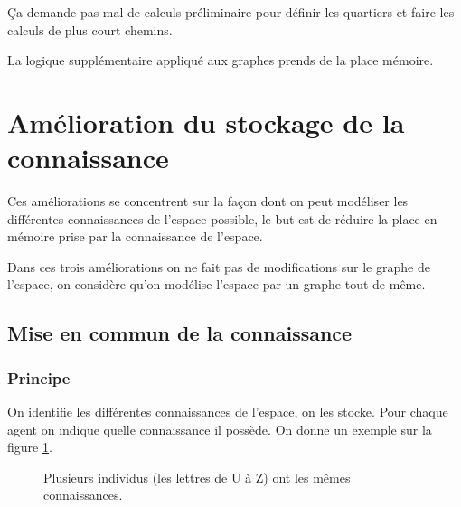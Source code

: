 \documentclass[a4paper]{article}
\begin{document}
Ça demande pas mal de calculs préliminaire pour définir les quartiers et
faire les calculs de plus court chemins.

La logique supplémentaire appliqué aux graphes prends de la place mémoire.

\section{Amélioration du stockage de la connaissance}

Ces améliorations se concentrent sur la façon dont on peut modéliser les
différentes connaissances de l'espace possible, le but est de réduire la place
en mémoire prise par la connaissance de l'espace.

Dans ces trois améliorations on ne fait pas de modifications sur le graphe de
l'espace, on considère qu'on modélise l'espace par un graphe tout de même.

  \subsection{Mise en commun de la connaissance}

    \subsubsection{Principe}

On identifie les différentes connaissances de l'espace, on les stocke. Pour
chaque agent on indique quelle connaissance il possède. On donne un exemple sur
la figure \ref{fig:miseEnCommun}.

\begin{figure}
  \caption{Plusieurs individus (les lettres de U à Z) ont les mêmes
  connaissances.}
  \label{fig:miseEnCommun}
\end{figure}
\end{document}
